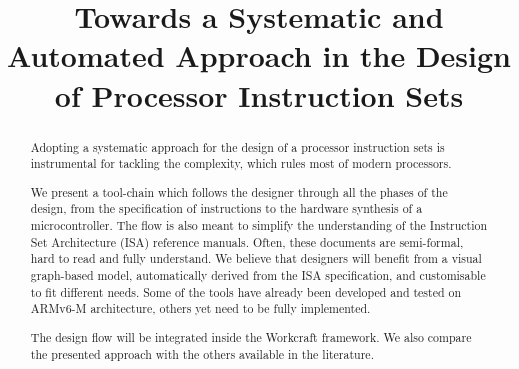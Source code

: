 \documentclass[conference]{IEEEtran}
\begin{document}


\title{Towards a Systematic and Automated Approach in the Design of Processor Instruction Sets}

\author{
\and
{}
}

\maketitle

\begin{abstract}
Adopting a systematic approach for the design of a processor instruction sets is
instrumental for tackling the complexity, which rules most of modern processors.

We present a tool-chain which follows the designer through all the phases of the
design, from the specification of instructions to the hardware synthesis of a
microcontroller. The flow is also meant to simplify the understanding of the
Instruction Set Architecture (ISA) reference manuals. Often, these documents are
semi-formal, hard to read and fully understand. We believe that designers will
benefit from a visual graph-based model, automatically derived from the ISA
specification, and customisable to fit different needs. Some of the tools have
already been developed and tested on ARMv6-M architecture, others yet need to be
fully implemented.

The design flow will be integrated inside the Workcraft framework. We also compare
the presented approach with the others available in the literature.
\end{abstract}
\end{document}
